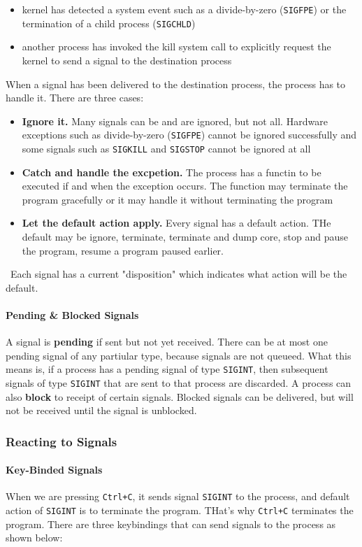 \documentclass{article}
\newcommand{\bold}[1]{\textbf{#1}}
\renewcommand{\b}{\item[$\circ$]}
\newcommand{\newlist}{\begin{itemize}}
\renewcommand{\endlist}{\end{itemize}}
\newcommand{\code}[1]{\texttt{#1}}
\begin{document}
\newlist
\b kernel has detected a system event such as a divide-by-zero (\code{SIGFPE}) or the termination of a child process (\code{SIGCHLD})
\b another process has invoked the kill system call to explicitly request the kernel to send a signal to the destination process
\endlist

When a signal has been delivered to the destination process, the process has to handle it. There are three cases:

\newlist 
\b \bold{Ignore it.} Many signals can be and are ignored, but not all. Hardware exceptions such as divide-by-zero (\code{SIGFPE}) cannot be ignored successfully and some signals such as \code{SIGKILL} and \code{SIGSTOP} cannot be ignored at all
\b \bold{Catch and handle the excpetion.} The process has a functin to be executed if and when the exception occurs. The function may terminate the program gracefully or it may handle it without terminating the program
\b \bold{Let the default action apply.} Every signal has a default action. THe default may be ignore, terminate, terminate and dump core, stop and pause the program, resume a program paused earlier.
\endlist

\ Each signal has a current "disposition" which indicates what action will be the default.

\paragraph{Pending \& Blocked Signals}

A signal is \bold{pending} if sent but not yet received. There can be at most one pending signal of any partiular type, because signals are not queueed. What this means is, if a process has a pending signal of type \code{SIGINT}, then subsequent signals of type \code{SIGINT} that are sent to that process are discarded. A process can also \bold{block} to receipt of certain signals. Blocked signals can be delivered, but will not be received until the signal is unblocked. 

\subsubsection{Reacting to Signals}

\paragraph{Key-Binded Signals}

When we are pressing \code{Ctrl+C}, it sends signal \code{SIGINT} to the process, and default action of \code{SIGINT} is to terminate the program. THat's why \code{Ctrl+C} terminates the program. There are three keybindings that can send signals to the process as shown below:
\end{document}

